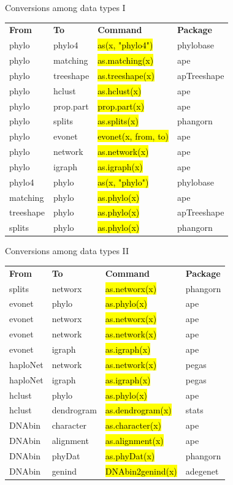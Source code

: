 \documentclass[compress, ucs, xelatex, 11pt, xcolor=svgnames,
  hyperref={
    bookmarks=true,
    unicode=true,
    colorlinks=true,
    pdftitle={Molecular data in R},
    plainpages=false,
    pdfauthor={Vojtech Zeisek},
    pdfsubject={Course about phylogeny and evolution in R},
    pdfcreator={XeLaTeX},
    pdfkeywords={R, evolution, phylogeny, molecular data},
    linkcolor=Tomato,
    anchorcolor=SaddleBrown,
    citecolor=Goldenrod,
    filecolor=DarkMagenta,
    menucolor=Sienna,
    urlcolor=DarkTurquoise,
    pdftex},
  url={hyphens, lowtilde} %
  ]{beamer}
\renewcommand{\texttt}[1]{\hl{\ttfamily #1}}
\begin{document}
\begin{frame}{Conversions among data types I}
  \begin{tabular}{llll}
    \textbf{From} & \textbf{To} & \textbf{Command} & \textbf{Package}\\
    phylo & phylo4 & \texttt{as(x, "phylo4")} & phylobase\\
    phylo & matching & \texttt{as.matching(x)} & ape\\
    phylo & treeshape & \texttt{as.treeshape(x)} & apTreeshape\\
    phylo & hclust & \texttt{as.hclust(x)} & ape\\
    phylo & prop.part & \texttt{prop.part(x)} & ape\\
    phylo & splits & \texttt{as.splits(x)} & phangorn\\
    phylo & evonet & \texttt{evonet(x, from, to)} & ape\\
    phylo & network & \texttt{as.network(x)} & ape\\
    phylo & igraph & \texttt{as.igraph(x)} & ape\\
    phylo4 & phylo & \texttt{as(x, "phylo")} & phylobase\\
    matching & phylo & \texttt{as.phylo(x)} & ape\\
    treeshape & phylo & \texttt{as.phylo(x)} & apTreeshape\\
    splits & phylo & \texttt{as.phylo(x)} & phangorn
  \end{tabular}
\end{frame}

\begin{frame}{Conversions among data types II}
  \begin{tabular}{llll}
    \textbf{From} & \textbf{To} & \textbf{Command} & \textbf{Package}\\
    splits & networx & \texttt{as.networx(x)} & phangorn\\
    evonet & phylo & \texttt{as.phylo(x)} & ape\\
    evonet & networx & \texttt{as.networx(x)} & ape\\
    evonet & network & \texttt{as.network(x)} & ape\\
    evonet & igraph & \texttt{as.igraph(x)} & ape\\
    haploNet & network & \texttt{as.network(x)} & pegas\\
    haploNet & igraph & \texttt{as.igraph(x)} & pegas\\
    hclust & phylo & \texttt{as.phylo(x)} & ape\\
    hclust & dendrogram & \texttt{as.dendrogram(x)} & stats\\
    DNAbin & character & \texttt{as.character(x)} & ape\\
    DNAbin & alignment & \texttt{as.alignment(x)} & ape\\
    DNAbin & phyDat & \texttt{as.phyDat(x)} & phangorn\\
    DNAbin & genind & \texttt{DNAbin2genind(x)} & adegenet
  \end{tabular}
\end{frame}
\end{document}
